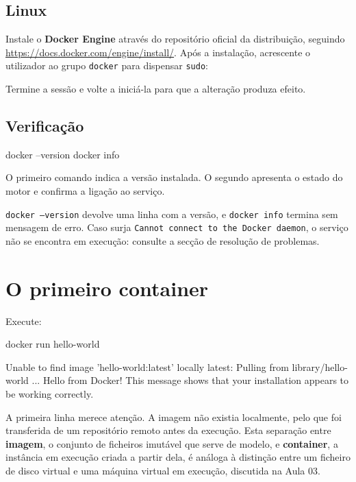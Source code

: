 \documentclass[11pt,a4paper]{article}
\begin{document}
\subsection{Linux}

Instale o \textbf{Docker Engine} através do repositório oficial da distribuição, seguindo \url{https://docs.docker.com/engine/install/}. Após a instalação, acrescente o utilizador ao grupo \texttt{docker} para dispensar \texttt{sudo}:


Termine a sessão e volte a iniciá-la para que a alteração produza efeito.

\subsection{Verificação}

\begin{terminal}
docker --version
docker info
\end{terminal}

O primeiro comando indica a versão instalada. O segundo apresenta o estado do motor e confirma a ligação ao serviço.

\begin{verificar}
\texttt{docker --version} devolve uma linha com a versão, e \texttt{docker info} termina sem mensagem de erro. Caso surja \texttt{Cannot connect to the Docker daemon}, o serviço não se encontra em execução: consulte a secção de resolução de problemas.
\end{verificar}

\section{O primeiro container}

Execute:

\begin{terminal}
docker run hello-world
\end{terminal}

\begin{saida}
Unable to find image 'hello-world:latest' locally
latest: Pulling from library/hello-world
...
Hello from Docker!
This message shows that your installation appears to be working correctly.
\end{saida}

A primeira linha merece atenção. A imagem não existia localmente, pelo que foi transferida de um repositório remoto antes da execução. Esta separação entre \textbf{imagem}, o conjunto de ficheiros imutável que serve de modelo, e \textbf{container}, a instância em execução criada a partir dela, é análoga à distinção entre um ficheiro de disco virtual e uma máquina virtual em execução, discutida na Aula 03.
\end{document}
